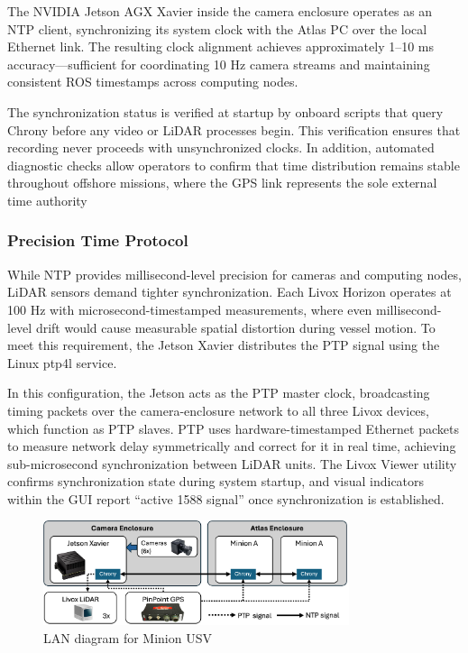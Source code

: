 \documentclass{erauthesis}
\begin{document}
The NVIDIA Jetson AGX Xavier inside the camera enclosure operates as an \ac{NTP} client, synchronizing its system clock with the Atlas PC over the local Ethernet link. The resulting clock alignment achieves approximately 1–10 ms accuracy—sufficient for coordinating 10 Hz camera streams and maintaining consistent ROS timestamps across computing nodes.

The synchronization status is verified at startup by onboard scripts that query Chrony before any video or LiDAR processes begin. This verification ensures that recording never proceeds with unsynchronized clocks. In addition, automated diagnostic checks allow operators to confirm that time distribution remains stable throughout offshore missions, where the GPS link represents the sole external time authority

\subsubsection{Precision Time Protocol} \label{PTP}
While \ac{NTP} provides millisecond-level precision for cameras and computing nodes, LiDAR sensors demand tighter synchronization. Each Livox Horizon operates at 100 Hz with microsecond-timestamped measurements, where even millisecond-level drift would cause measurable spatial distortion during vessel motion. To meet this requirement, the Jetson Xavier distributes the \ac{PTP} signal using the Linux ptp4l service.

In this configuration, the Jetson acts as the \ac{PTP} master clock, broadcasting timing packets over the camera-enclosure network to all three Livox devices, which function as \ac{PTP} slaves. \ac{PTP} uses hardware-timestamped Ethernet packets to measure network delay symmetrically and correct for it in real time, achieving sub-microsecond synchronization between LiDAR units. The Livox Viewer utility confirms synchronization state during system startup, and visual indicators within the GUI report “active 1588 signal” once synchronization is established.

\begin{figure}[htbp]
\centering
\includegraphics[width=0.8\textwidth]{Images/NTP.png}
\caption{LAN diagram for Minion USV}
\label{fig:network_sync}
\end{figure}
\end{document}
